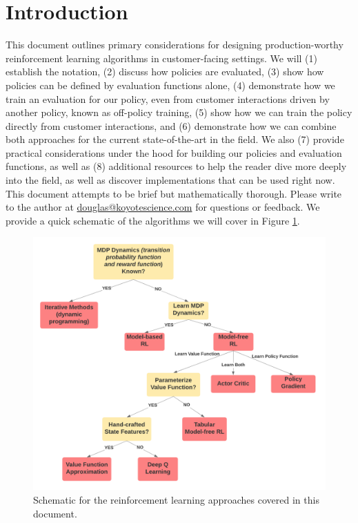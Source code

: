 \documentclass{article}
\begin{document}
\section{Introduction}
This document outlines primary considerations for designing production-worthy reinforcement learning algorithms in customer-facing settings. We will (1) establish the notation, (2) discuss how policies are evaluated, (3) show how policies can be defined by evaluation functions alone, (4) demonstrate how we train an evaluation for our policy, even from customer interactions driven by another policy, known as off-policy training, (5) show how we can train the policy directly from customer interactions, and (6) demonstrate how we can combine both approaches for the current state-of-the-art in the field. We also (7) provide practical considerations under the hood for building our policies and evaluation functions, as well as (8) additional resources to help the reader dive more deeply into the field, as well as discover implementations that can be used right now. This document attempts to be brief but mathematically thorough. Please write to the author at \href{mailto:douglas@koyotescience.com}{douglas@koyotescience.com} for questions or feedback. We provide a quick schematic of the algorithms we will cover in Figure \ref{fig:rl_schematic}.
\begin{figure}\label{fig:rl_schematic}
    \begin{center}
    \includegraphics[width=0.75\linewidth]{rl_schematic}
    \caption{Schematic for the reinforcement learning approaches covered in this document.\footnotemark}
    \end{center}
\end{figure}
\end{document}
